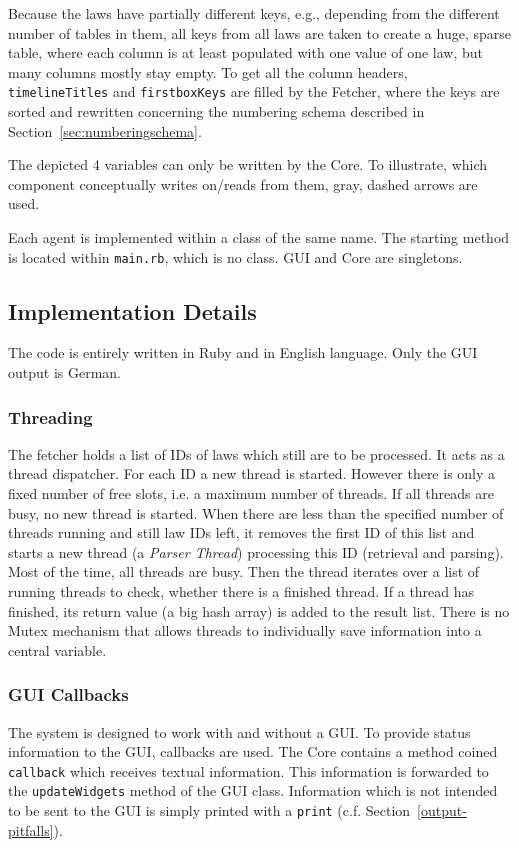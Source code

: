 \documentclass{scrartcl}
\begin{document}
Because the laws have partially different keys, e.g., depending from the different number of tables in them, all keys from all laws are taken to create a huge, sparse table, where each column is at least populated with one value of one law, but many columns mostly stay empty. To get all the column headers, \texttt{timelineTitles} and \texttt{firstboxKeys} are filled by the Fetcher, where the keys are sorted and rewritten concerning the numbering schema described in Section~\ref{sec:numberingschema}.

The depicted 4 variables can only be written by the Core. To illustrate, which component conceptually writes on/reads from them, gray, dashed arrows are used.

Each agent is implemented within a class of the same name. The starting method is located within \texttt{main.rb}, which is no class. GUI and Core are singletons.

\subsection{Implementation Details}
The code is entirely written in Ruby and in English language. Only the GUI output is German.

\subsubsection{Threading}
\label{sec:threading}
The fetcher holds a list of IDs of laws which still are to be processed. It acts as a thread dispatcher. For each ID a new thread is started. However there is only a fixed number of free slots, i.e. a maximum number of threads. If all threads are busy, no new thread is started. When there are less than the specified number of threads running and still law IDs left, it removes the first ID of this list and starts a new thread (a \textit{Parser Thread}) processing this ID (retrieval and parsing). Most of the time, all threads are busy. Then the thread iterates over a list of running threads to check, whether there is a finished thread. If a thread has finished, its return value (a big hash array) is added to the result list. There is no Mutex mechanism that allows threads to individually save information into a central variable.

\subsubsection{GUI Callbacks}
The system is designed to work with and without a GUI. To provide status information to the GUI, callbacks are used. The Core contains a method coined \texttt{callback} which receives textual information. This information is forwarded to the \texttt{updateWidgets} method of the GUI class. Information which is not intended to be sent to the GUI is simply printed with a \texttt{print} (c.f. Section~\ref{output-pitfalls}).
\end{document}
